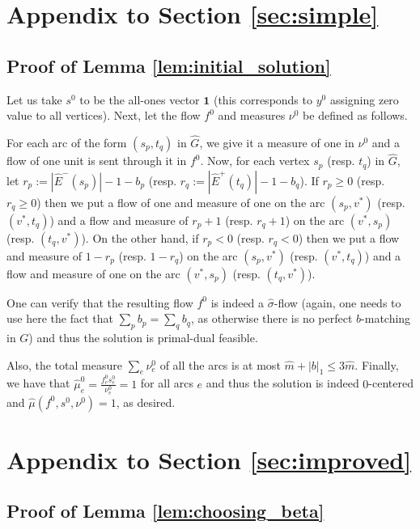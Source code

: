 \documentclass[11pt, letterpaper]{article}
\newcommand{\onev}{\mathbf{1}}
\newcommand{\onorm}[1]{|#1|_{1}}
\newcommand{\hG}{\widehat{G}}
\newcommand{\hE}{\widehat{E}}
\newcommand{\hm}{\widehat{m}}
\newcommand{\hmu}{\hat{\mu}}
\newcommand{\vnu}{\boldsymbol{\mathit{\nu}}}
\newcommand{\hvsigma}{\boldsymbol{\mathit{\hat{\sigma}}}}
\newcommand{\bb}{\boldsymbol{\mathit{b}}}
\newcommand{\ff}{\boldsymbol{\mathit{f}}}
\renewcommand{\ss}{\boldsymbol{\mathit{s}}}
\newcommand{\yy}{\boldsymbol{\mathit{y}}}
\begin{document}
 \section{Appendix to Section \ref{sec:simple}}\label{app:basic_algorithm}

\subsection{Proof of Lemma \ref{lem:initial_solution}}\label{app:initial_solution}


Let us take $\ss^0$ to be the all-ones vector $\onev$ (this corresponds to $\yy^0$ assigning zero value to all vertices). Next, let the flow $\ff^0$ and measures $\vnu^0$ be defined as follows. 

For each arc of the form $(s_p,t_q)$ in $\hG$, we give it a measure of one in $\vnu^0$ and a flow of one unit is sent through it in $\ff^0$. Now, for each vertex $s_p$ (resp. $t_q$) in $\hG$, let $r_p:=|\hE^-(s_p)|-1-b_p$ (resp. $r_q:=|\hE^+(t_q)|-1-b_q$). If $r_p\geq 0$ (resp. $r_q\geq 0$) then we put a flow of one and measure of one on the arc $(s_p,v^*)$ (resp. $(v^*,t_q)$) and a flow and measure of $r_p+1$ (resp. $r_q+1$)  on the arc $(v^*,s_p)$ (resp. $(t_q,v^*)$). On the other hand, if $r_p<0$ (resp. $r_q<0$) then we put a flow and measure of $1-r_p$ (resp. $1-r_q$) on the arc $(s_p,v^*)$ (resp. $(v^*,t_q)$) and a flow and measure of one on the arc $(v^*,s_p)$ (resp. $(t_q,v^*)$).

One can verify that the resulting flow $\ff^0$ is indeed a $\hvsigma$-flow (again, one needs to use here the fact that $\sum_p b_p=\sum_q b_q$, as otherwise there is no perfect $\bb$-matching in $G$) and thus the solution is primal-dual feasible. 

Also, the total measure $\sum_e \nu^0_e$ of all the arcs is at most $\hm+\onorm{\bb}\leq 3\hm$. Finally, we have that $\hmu_e^0=\frac{f_e^0s_e^0}{\nu_e^0}=1$ for all arcs $e$ and thus the solution is indeed $0$-centered and $\hmu(\ff^0,\ss^0,\vnu^0)=1$, as desired.

 \section{Appendix to Section \ref{sec:improved}}\label{app:improved_algorithm}




\subsection{Proof of Lemma \ref{lem:choosing_beta}}\label{app:choosing_beta}
\end{document}
